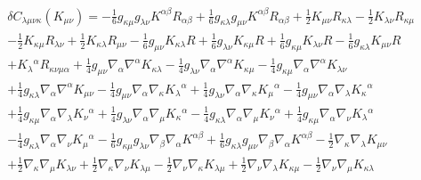 \begin{eqnarray}
&&\delta C_{\lambda\mu\nu\kappa}(K_{\mu\nu})=- \tfrac{1}{6} g_{\kappa \mu} g_{\lambda \nu} K^{\alpha \beta} R_{\alpha \beta} + \tfrac{1}{6} g_{\kappa \lambda} g_{\mu \nu} K^{\alpha \beta} R_{\alpha \beta} + \tfrac{1}{2} K_{\mu \nu} R_{\kappa \lambda} -  \tfrac{1}{2} K_{\lambda \nu} R_{\kappa \mu}  
\nonumber\\
&&-  \tfrac{1}{2} K_{\kappa \mu} R_{\lambda \nu} 
+ \tfrac{1}{2} K_{\kappa \lambda} R_{\mu \nu} -  \tfrac{1}{6} g_{\mu \nu} K_{\kappa \lambda} R 
+ \tfrac{1}{6} g_{\lambda \nu} K_{\kappa \mu} R + \tfrac{1}{6} g_{\kappa \mu} K_{\lambda \nu} R -  \tfrac{1}{6} g_{\kappa \lambda} K_{\mu \nu} R 
\nonumber\\
&& + K_{\lambda}{}^{\alpha} R_{\kappa \nu \mu \alpha} + \tfrac{1}{4} g_{\mu \nu} \nabla_{\alpha}\nabla^{\alpha}K_{\kappa \lambda} -  \tfrac{1}{4} g_{\lambda \nu} \nabla_{\alpha}\nabla^{\alpha}K_{\kappa \mu} 
-  \tfrac{1}{4} g_{\kappa \mu} \nabla_{\alpha}\nabla^{\alpha}K_{\lambda \nu}  
\nonumber\\
&&
+ \tfrac{1}{4} g_{\kappa \lambda} \nabla_{\alpha}\nabla^{\alpha}K_{\mu \nu} 
-  \tfrac{1}{4} g_{\mu \nu} \nabla_{\alpha}\nabla_{\kappa}K_{\lambda}{}^{\alpha} + \tfrac{1}{4} g_{\lambda \nu} \nabla_{\alpha}\nabla_{\kappa}K_{\mu}{}^{\alpha} -  \tfrac{1}{4} g_{\mu \nu} \nabla_{\alpha}\nabla_{\lambda}K_{\kappa}{}^{\alpha}  
\nonumber\\
&&
 + \tfrac{1}{4} g_{\kappa \mu} \nabla_{\alpha}\nabla_{\lambda}K_{\nu}{}^{\alpha} 
+ \tfrac{1}{4} g_{\lambda \nu} \nabla_{\alpha}\nabla_{\mu}K_{\kappa}{}^{\alpha} -  \tfrac{1}{4} g_{\kappa \lambda} \nabla_{\alpha}\nabla_{\mu}K_{\nu}{}^{\alpha} + \tfrac{1}{4} g_{\kappa \mu} \nabla_{\alpha}\nabla_{\nu}K_{\lambda}{}^{\alpha}  
\nonumber\\
&&-  \tfrac{1}{4} g_{\kappa \lambda} \nabla_{\alpha}\nabla_{\nu}K_{\mu}{}^{\alpha} 
-  \tfrac{1}{6} g_{\kappa \mu} g_{\lambda \nu} \nabla_{\beta}\nabla_{\alpha}K^{\alpha \beta} 
+ \tfrac{1}{6} g_{\kappa \lambda} g_{\mu \nu} \nabla_{\beta}\nabla_{\alpha}K^{\alpha \beta} 
-  \tfrac{1}{2} \nabla_{\kappa}\nabla_{\lambda}K_{\mu \nu}  
\nonumber\\
&&+ \tfrac{1}{2} \nabla_{\kappa}\nabla_{\mu}K_{\lambda \nu} 
+ \tfrac{1}{2} \nabla_{\kappa}\nabla_{\nu}K_{\lambda \mu}  
- \tfrac{1}{2} \nabla_{\nu}\nabla_{\kappa}K_{\lambda \mu} + \tfrac{1}{2} \nabla_{\nu}\nabla_{\lambda}K_{\kappa \mu} 
-  \tfrac{1}{2} \nabla_{\nu}\nabla_{\mu}K_{\kappa \lambda}
\nonumber\\
\label{AP51}
\end{eqnarray}

